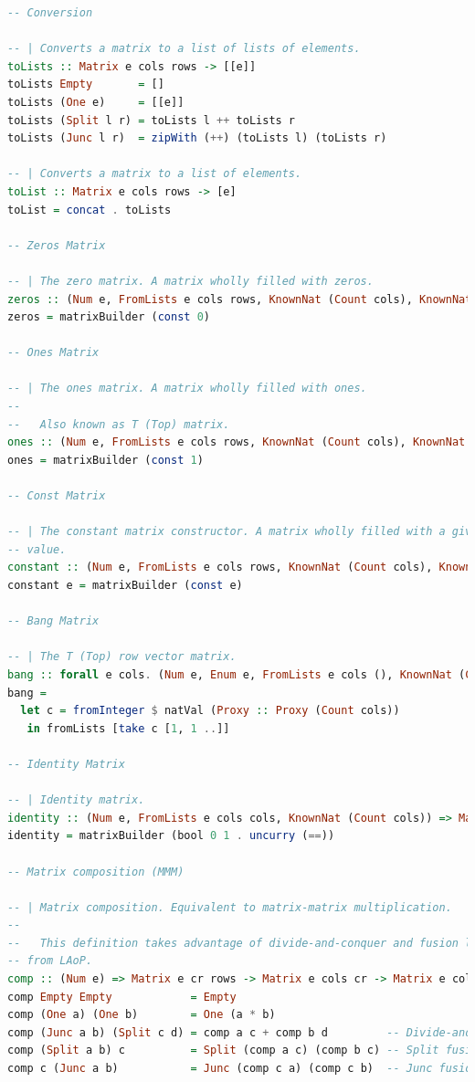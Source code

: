 \documentclass[
  oneside,
  11pt, a4paper,
  footinclude=true,
  headinclude=true,
  cleardoublepage=empty
]{scrbook}
\theoremstyle{definition}
\theoremstyle{definition}
\begin{document}
\begin{lstlisting}[language=Haskell, caption={Type safe inductive matrix library},captionpos=b]
-- Conversion

-- | Converts a matrix to a list of lists of elements.
toLists :: Matrix e cols rows -> [[e]]
toLists Empty       = []
toLists (One e)     = [[e]]
toLists (Split l r) = toLists l ++ toLists r
toLists (Junc l r)  = zipWith (++) (toLists l) (toLists r)

-- | Converts a matrix to a list of elements.
toList :: Matrix e cols rows -> [e]
toList = concat . toLists

-- Zeros Matrix

-- | The zero matrix. A matrix wholly filled with zeros.
zeros :: (Num e, FromLists e cols rows, KnownNat (Count cols), KnownNat (Count rows)) => Matrix e cols rows
zeros = matrixBuilder (const 0)

-- Ones Matrix

-- | The ones matrix. A matrix wholly filled with ones.
--
--   Also known as T (Top) matrix.
ones :: (Num e, FromLists e cols rows, KnownNat (Count cols), KnownNat (Count rows)) => Matrix e cols rows
ones = matrixBuilder (const 1)

-- Const Matrix

-- | The constant matrix constructor. A matrix wholly filled with a given
-- value.
constant :: (Num e, FromLists e cols rows, KnownNat (Count cols), KnownNat (Count rows)) => e -> Matrix e cols rows
constant e = matrixBuilder (const e)

-- Bang Matrix

-- | The T (Top) row vector matrix.
bang :: forall e cols. (Num e, Enum e, FromLists e cols (), KnownNat (Count cols)) => Matrix e cols ()
bang =
  let c = fromInteger $ natVal (Proxy :: Proxy (Count cols))
   in fromLists [take c [1, 1 ..]]

-- Identity Matrix

-- | Identity matrix.
identity :: (Num e, FromLists e cols cols, KnownNat (Count cols)) => Matrix e cols cols
identity = matrixBuilder (bool 0 1 . uncurry (==))

-- Matrix composition (MMM)

-- | Matrix composition. Equivalent to matrix-matrix multiplication.
--
--   This definition takes advantage of divide-and-conquer and fusion laws
-- from LAoP.
comp :: (Num e) => Matrix e cr rows -> Matrix e cols cr -> Matrix e cols rows
comp Empty Empty            = Empty
comp (One a) (One b)        = One (a * b)
comp (Junc a b) (Split c d) = comp a c + comp b d         -- Divide-and-conquer law
comp (Split a b) c          = Split (comp a c) (comp b c) -- Split fusion law
comp c (Junc a b)           = Junc (comp c a) (comp c b)  -- Junc fusion law


\end{lstlisting}
\end{document}
